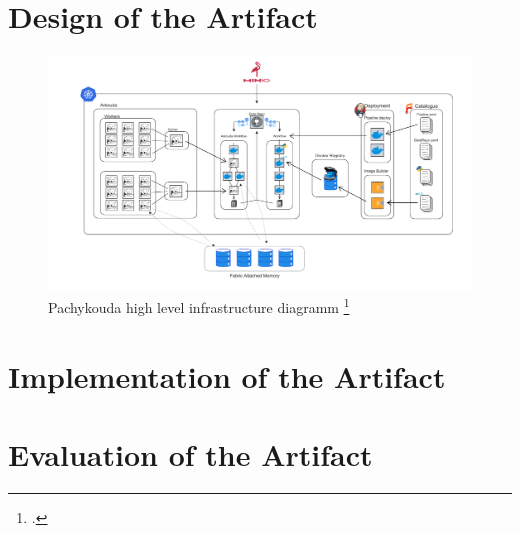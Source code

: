 \newpage

\section{Design of the Artifact}





\begin{figure}[htb]
    \centering
    \includegraphics[width=16cm]{graphics/pachykouda.png}
    \caption[pachykouda high level diagramm]{Pachykouda high level infrastructure diagramm \footcite{eckerthHASPHPCApplications}}
    \label{abb:Logo2cmBreit}
\end{figure}


\newpage


\section{Implementation of the Artifact}



\newpage


\section{Evaluation of the Artifact}

\newpage
